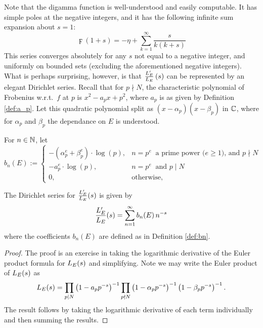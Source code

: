 Note that the digamma function is well-understood and easily computable. It has simple poles at the negative integers, and it has the following infinite sum expansion about $s=1$:
\begin{equation}\label{eqn:digamma_sum}
\digamma(1+s) = -\eta + \sum_{k=1}^{\infty} \frac{s}{k(k+s)}
\end{equation}
This series converges absolutely for any $s$ not equal to a negative integer, and uniformly on bounded sets (excluding the aforementioned negative integers).\\

What is perhaps surprising, however, is that $\frac{L_E^{\prime}}{L_E}\left(s\right)$ can be represented by an elegant Dirichlet series. Recall that for $p \nmid N$, the characteristic polynomial of Frobenius w.r.t.~$f$ at $p$ is $x^2 - a_p x + p^2$, where $a_p$ is as given by Definition \ref{def:a_p}. Let this quadratic polynomial split as $(x-\alpha_p)(x-\beta_p)$ in $\mathbb{C}$, where for $\alpha_p$ and $\beta_p$ the dependance on $E$ is understood. \\

\begin{definition}\label{def:bn}
For $n \in \mathbb{N}$, let
\begin{equation}
b_n(E) := \begin{cases}
-\left(\alpha_p^e+\beta_p^e\right)\cdot \log(p), & n=p^e\;\;\text{a prime power ($e\ge1$), and $p \nmid N$} \\
-a_p^e \cdot \log(p), & n=p^e\;\;\text{and $p \mid N$} \\
0, & \text{otherwise,} \end{cases}
\end{equation}
\end{definition}

\begin{lemma}
The Dirichlet series for $\frac{L_E^{\prime}}{L_E}(s)$ is given by
\begin{equation}
\frac{L_E^{\prime}}{L_E}(s) = \sum_{n=1}^{\infty} b_n(E)\, n^{-s}
\end{equation}
where the coefficients $b_n(E)$ are defined as in Definition \ref{def:bn}. \\
\end{lemma}
\begin{proof}
The proof is an exercise in taking the logarithmic derivative of the Euler product formula for $L_E(s)$ and simplifying. Note we may write the Euler product of $L_E(s)$ as
\begin{equation}
L_E(s) = \prod_{p|N} \left(1-a_p p^{-s}\right)^{-1} \prod_{p\nmid N} \left(1-\alpha_p p^{-s}\right)^{-1}\left(1-\beta_p p^{-s}\right)^{-1}.
\end{equation}
The result follows by taking the logarithmic derivative of each term individually and then summing the results.
\end{proof}

